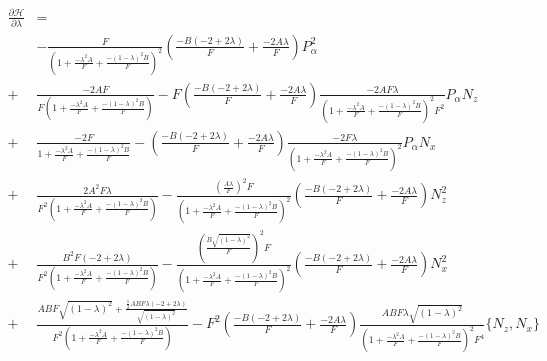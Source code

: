 \documentclass{article}
\begin{document}
\begin{align*}
	\frac{\partial \mathscr{H}}{\partial \lambda} &= \\
	&  - \frac{F}{\left( 1 + \frac{ - \lambda^{2} A}{F} + \frac{ - \left( 1 - \lambda \right)^{2} B}{F} \right)^{2}} \left( \frac{ - B \left( -2 + 2 \lambda \right)}{F} + \frac{ - 2 A \lambda}{F} \right) P_{\alpha}^{2} \\
	+& \frac{ - 2 A F}{F \left( 1 + \frac{ - \lambda^{2} A}{F} + \frac{ - \left( 1 - \lambda \right)^{2} B}{F} \right)} - F \left( \frac{ - B \left( -2 + 2 \lambda \right)}{F} + \frac{ - 2 A \lambda}{F} \right) \frac{ - 2 A F \lambda}{\left( 1 + \frac{ - \lambda^{2} A}{F} + \frac{ - \left( 1 - \lambda \right)^{2} B}{F} \right)^{2} F^{2}} P_{\alpha}N_{z} \\
	+& \frac{ - 2 F}{1 + \frac{ - \lambda^{2} A}{F} + \frac{ - \left( 1 - \lambda \right)^{2} B}{F}} - \left( \frac{ - B \left( -2 + 2 \lambda \right)}{F} + \frac{ - 2 A \lambda}{F} \right) \frac{ - 2 F \lambda}{\left( 1 + \frac{ - \lambda^{2} A}{F} + \frac{ - \left( 1 - \lambda \right)^{2} B}{F} \right)^{2}} P_{\alpha}N_{x} \\
	+& \frac{2 A^{2} F \lambda}{F^{2} \left( 1 + \frac{ - \lambda^{2} A}{F} + \frac{ - \left( 1 - \lambda \right)^{2} B}{F} \right)} - \frac{\left( \frac{A \lambda}{F} \right)^{2} F}{\left( 1 + \frac{ - \lambda^{2} A}{F} + \frac{ - \left( 1 - \lambda \right)^{2} B}{F} \right)^{2}} \left( \frac{ - B \left( -2 + 2 \lambda \right)}{F} + \frac{ - 2 A \lambda}{F} \right) N_{z}^{2} \\
	+& \frac{B^{2} F \left( -2 + 2 \lambda \right)}{F^{2} \left( 1 + \frac{ - \lambda^{2} A}{F} + \frac{ - \left( 1 - \lambda \right)^{2} B}{F} \right)} - \frac{\left( \frac{B \sqrt{\left( 1 - \lambda \right)^{2}}}{F} \right)^{2} F}{\left( 1 + \frac{ - \lambda^{2} A}{F} + \frac{ - \left( 1 - \lambda \right)^{2} B}{F} \right)^{2}} \left( \frac{ - B \left( -2 + 2 \lambda \right)}{F} + \frac{ - 2 A \lambda}{F} \right) N_{x}^{2} \\
	+& \frac{A B F \sqrt{\left( 1 - \lambda \right)^{2}} + \frac{\frac{1}{2} A B F \lambda \left( -2 + 2 \lambda \right)}{\sqrt{\left( 1 - \lambda \right)^{2}}}}{F^{2} \left( 1 + \frac{ - \lambda^{2} A}{F} + \frac{ - \left( 1 - \lambda \right)^{2} B}{F} \right)} - F^{2} \left( \frac{ - B \left( -2 + 2 \lambda \right)}{F} + \frac{ - 2 A \lambda}{F} \right) \frac{A B F \lambda \sqrt{\left( 1 - \lambda \right)^{2}}}{\left( 1 + \frac{ - \lambda^{2} A}{F} + \frac{ - \left( 1 - \lambda \right)^{2} B}{F} \right)^{2} F^{4}} \{N_{z},N_{x}\}
\end{align*}
\end{document}
